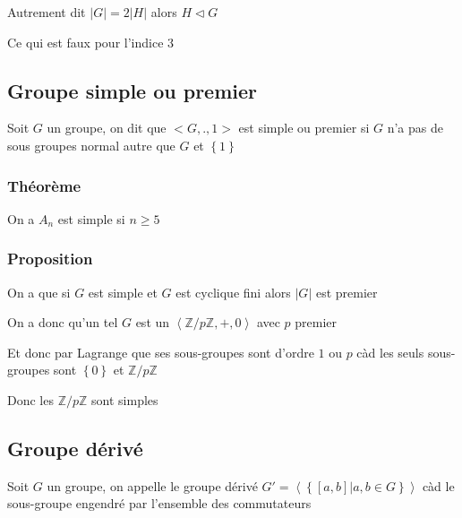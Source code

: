 \documentclass[a4paper,10pt]{article}
\newcommand{\grp}[1]{\left\langle #1 \right\rangle}
\newcommand{\Z}{\mathbb{Z}}
\newcommand{\tset}[1]{\left\lbrace #1 \right\rbrace}
\newcommand{\normal}{\triangleleft}
\begin{document}
Autrement dit $\vert G \vert = 2 \vert H \vert$ alors $H \normal G$

Ce qui est faux pour l'indice 3

\subsection{Groupe simple ou premier}

Soit $G$ un groupe, on dit que $<G,.,1>$ est simple ou premier si $G$ n'a pas de sous groupes normal autre que $G$ et $\tset{1}$

\subsubsection{Théorème}

On a $A_n$ est simple si $n \geq 5$

\subsubsection{Proposition}

On a que si $G$ est simple et $G$ est cyclique fini alors $\vert G \vert$ est premier

On a donc qu'un tel $G$ est un $\grp{\Z/p \Z, + ,0}$ avec $p$ premier

Et donc par Lagrange que ses sous-groupes sont d'ordre $1$ ou $p$ càd les seuls sous-groupes sont $\tset{0}$ et $\Z / p \Z$

Donc les $\Z / p \Z$ sont simples

\subsection{Groupe dérivé}

Soit $G$ un groupe, on appelle le groupe dérivé $G' = \grp{\tset{[a,b] \vert a,b \in G}}$ càd le sous-groupe engendré par l'ensemble des commutateurs
\end{document}

